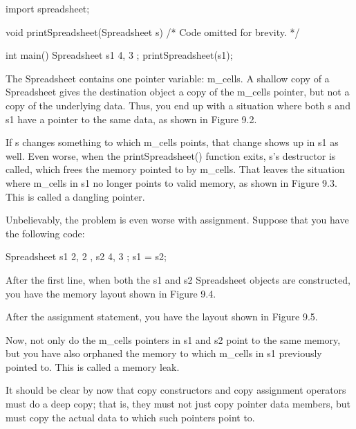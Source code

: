\begin{cpp}
import spreadsheet;

void printSpreadsheet(Spreadsheet s) { /* Code omitted for brevity. */ }

int main()
{
    Spreadsheet s1 { 4, 3 };
    printSpreadsheet(s1);
}
\end{cpp}

The Spreadsheet contains one pointer variable: m\_cells. A shallow copy of a Spreadsheet gives the destination object a copy of the m\_cells pointer, but not a copy of the underlying data. Thus, you end up with a situation where both s and s1 have a pointer to the same data, as shown in Figure 9.2.


If s changes something to which m\_cells points, that change shows up in s1 as well. Even worse, when the printSpreadsheet() function exits, s’s destructor is called, which frees the memory pointed to by m\_cells. That leaves the situation where m\_cells in s1 no longer points to valid memory, as shown in Figure 9.3. This is called a dangling pointer.


Unbelievably, the problem is even worse with assignment. Suppose that you have the following code:

\begin{cpp}
Spreadsheet s1 { 2, 2 }, s2 { 4, 3 };
s1 = s2;
\end{cpp}

After the first line, when both the s1 and s2 Spreadsheet objects are constructed, you have the memory layout shown in Figure 9.4.


After the assignment statement, you have the layout shown in Figure 9.5.


Now, not only do the m\_cells pointers in s1 and s2 point to the same memory, but you have also orphaned the memory to which m\_cells in s1 previously pointed to. This is called a memory leak.

It should be clear by now that copy constructors and copy assignment operators must do a deep copy; that is, they must not just copy pointer data members, but must copy the actual data to which such pointers point to.

